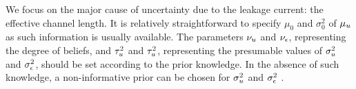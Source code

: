 We focus on the major cause of uncertainty due to the leakage current: the effective channel length. It is relatively straightforward to specify $\mu_0$ and $\sigma^2_0$ of $\mu_u$ as such information is usually available. The parameters $\nu_u$ and $\nu_\epsilon$, representing the degree of beliefs, and $\tau^2_u$ and $\tau^2_u$, representing the presumable values of $\sigma^2_u$ and $\sigma^2_\epsilon$, should be set according to the prior knowledge. In the absence of such knowledge, a non-informative prior can be chosen for $\sigma^2_u$ and $\sigma^2_\epsilon$ \cite{gelman2004}.
